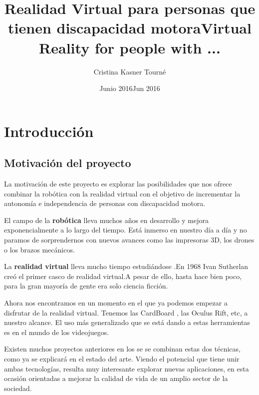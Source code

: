\documentclass[twoside, 12pt]{epstfg}
\title[spa]{Realidad Virtual para personas que tienen discapacidad motora}
\title[eng]{Virtual Reality for people with ...}
\author{Cristina Kasner Tourné}
\date[spa]{Junio 2016}
\date[eng]{Jun 2016}
\begin{document}

\frontmatter

\maketitle[spa]

\makeinnertitle[spa]

\makeabstract[spa]
\makeabstract[eng]

\tableofcontents
\clearpage
\listoftables
\clearpage
\listoffigures
\cleardoublepage

\printnoidxglossaries

\mainmatter
\chapter{Introducción} 


\section{Motivación del proyecto}

La motivación de este proyecto es explorar las posibilidades que nos ofrece combinar la robótica con la realidad virtual con el objetivo de incrementar la autonomía e independencia de personas con discapacidad motora.

El campo de la \textbf{robótica} lleva muchos años en desarrollo y mejora exponencialmente a lo largo del tiempo. Está inmerso en nuestro día a día y no paramos de sorprendernos con nuevos avances como las impresoras 3D, los drones o los brazos mecánicos.

La \textbf{realidad virtual}  lleva mucho tiempo estudiándose .En 1968 Ivan Sutherlan creó el primer casco de realidad virtual.A pesar de ello, hasta hace bien poco, para la gran mayoría de gente era solo ciencia ficción.

Ahora nos encontramos en un momento en el que ya podemos empezar a disfrutar de la realidad virtual. Tenemos las CardBoard , las Oculus Rift, etc, a nuestro alcance.
El uso más generalizado que se está dando a estas herramientas es en el mundo de los videojuegos.

Existen muchos proyectos anteriores en los se se combinan estas dos técnicas, como ya se explicará en el estado del arte. Viendo el potencial que tiene unir ambas tecnologías, resulta muy interesante explorar nuevas aplicaciones, en esta ocasión orientadas a mejorar la calidad de vida de un amplio sector de la sociedad.
\end{document}
